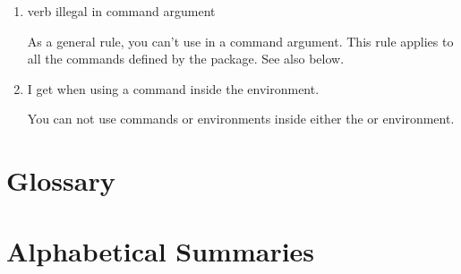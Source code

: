 \documentclass[fontsize=12pt]{scrbook}
\begin{document}
\begin{enumerate}
\item \gls{verb} illegal in command argument

As a general rule, you can't use  in a command
argument.  This rule applies to all the commands defined by the
 package.  See also below.

\item I get  when using
a  command inside the  environment.

You can not use  commands or environments inside either the 
 or  environment.

\end{enumerate}

\appendix
{}%
\disablethumbtabs

\chapter{Glossary}

\printmain[title=Terms]

\newpage

\printicons

\chapter{Alphabetical Summaries}\label{sec:summaries}

\printcmdenvsummary

\printclsstysummary

\renewcommand{\glsxtrbookindexcols}{1}

\backmatter
{}
\printuserguideindex

\cleartoevenpage

\cleartoevenpage\mbox{}\pagestyle{empty}
\end{document}
